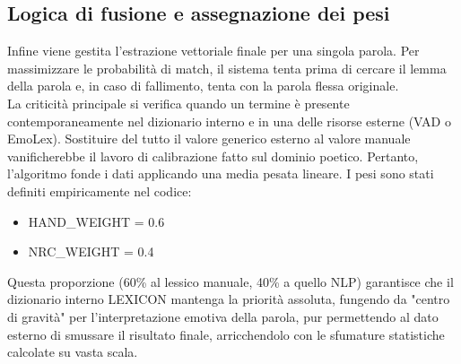 \subsection{Logica di fusione e assegnazione dei pesi}
Infine viene gestita l'estrazione vettoriale finale per una singola parola. Per massimizzare le probabilità di match, il sistema tenta prima di cercare 
il lemma della parola e, in caso di fallimento, tenta con la parola flessa originale.\\
La criticità principale si verifica quando un termine è presente contemporaneamente nel dizionario interno e in una delle risorse esterne (VAD o EmoLex). 
Sostituire del tutto il valore generico esterno al valore manuale vanificherebbe il lavoro di calibrazione fatto sul dominio poetico. Pertanto, l'algoritmo 
fonde i dati applicando una media pesata lineare. I pesi sono stati definiti empiricamente nel codice:
\begin{itemize}
    \item HAND\_WEIGHT = 0.6
    \item NRC\_WEIGHT = 0.4
\end{itemize}
Questa proporzione (60\% al lessico manuale, 40\% a quello NLP) garantisce che il dizionario interno LEXICON mantenga la priorità assoluta, 
fungendo da "centro di gravità" per l'interpretazione emotiva della parola, pur permettendo al dato esterno di smussare il risultato finale, 
arricchendolo con le sfumature statistiche calcolate su vasta scala.

